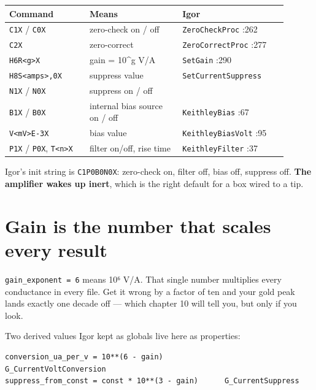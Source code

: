\small\setlength{\LTleft}{0pt}\setlength{\LTright}{\fill}
\begin{longtable}{@{}>{\raggedright\arraybackslash}p{0.26\linewidth}>{\raggedright\arraybackslash}p{0.30\linewidth}>{\raggedright\arraybackslash}p{0.34\linewidth}@{}}
\toprule
\textbf{Command} & \textbf{Means} & \textbf{Igor} \\
\midrule\endhead
\texttt{C1X} / \texttt{C0X} & zero-check on / off & \texttt{Zero\discretionary{}{}{}Check\discretionary{}{}{}Proc} :262 \\
\texttt{C2X} & zero-correct & \texttt{Zero\discretionary{}{}{}Correct\discretionary{}{}{}Proc} :277 \\
\texttt{H6R<g>X} & gain = 10\textasciicircum{}g V/A & \texttt{Set\discretionary{}{}{}Gain} :290 \\
\texttt{H8S<amps>,\discretionary{}{}{}0X} & suppress value & \texttt{Set\discretionary{}{}{}Current\discretionary{}{}{}Suppress} \\
\texttt{N1X} / \texttt{N0X} & suppress on / off &  \\
\texttt{B1X} / \texttt{B0X} & internal bias source on / off & \texttt{Keithley\discretionary{}{}{}Bias} :67 \\
\texttt{V<m\discretionary{}{}{}V>E-3X} & bias value & \texttt{Keithley\discretionary{}{}{}Bias\discretionary{}{}{}Volt} :95 \\
\texttt{P1X} / \texttt{P0X}, \texttt{T<n>X} & filter on/off, rise time & \texttt{Keithley\discretionary{}{}{}Filter} :37 \\
\bottomrule
\end{longtable}
\normalsize

Igor's init string is \texttt{C1P0B0N0X}: zero-check on, filter off, bias off, suppress off. \textbf{The amplifier wakes up inert}, which is the right default for a box wired to a tip.

\section{Gain is the number that scales every result}

\texttt{gain\_\discretionary{}{}{}exponent = 6} means 10⁶ V/A. That single number multiplies every conductance in every file. Get it wrong by a factor of ten and your gold peak lands exactly one decade off --- which chapter 10 will tell you, but only if you look.

Two derived values Igor kept as globals live here as properties:

\begin{lstlisting}[style=out]
conversion_ua_per_v = 10**(6 - gain)              G_CurrentVoltConversion
suppress_from_const = const * 10**(3 - gain)      G_CurrentSuppress
\end{lstlisting}

